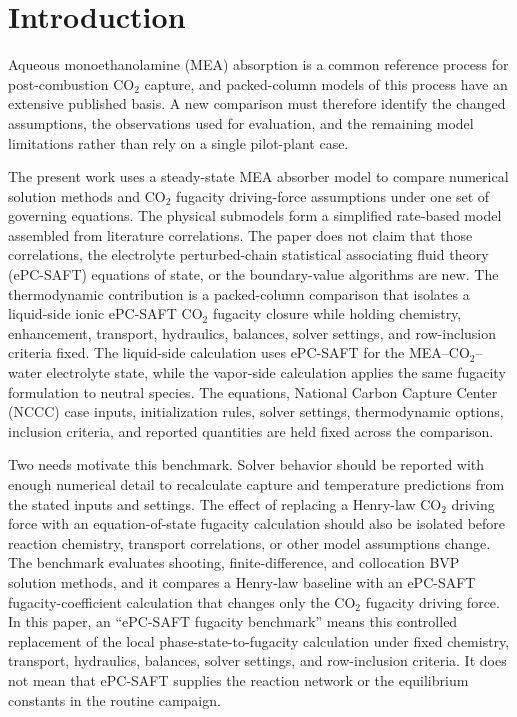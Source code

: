     \section{Introduction}\label{sec:introduction}
        Aqueous monoethanolamine (MEA) absorption is a common reference process for post-combustion CO$_2$ capture, and packed-column models of this process have an extensive published basis. A new comparison must therefore identify the changed assumptions, the observations used for evaluation, and the remaining model limitations rather than rely on a single pilot-plant case.

        The present work uses a steady-state MEA absorber model to compare numerical solution methods and CO$_2$ fugacity driving-force assumptions under one set of governing equations. The physical submodels form a simplified rate-based model assembled from literature correlations. The paper does not claim that those correlations, the electrolyte perturbed-chain statistical associating fluid theory (ePC-SAFT) equations of state, or the boundary-value algorithms are new. The thermodynamic contribution is a packed-column comparison that isolates a liquid-side ionic ePC-SAFT CO$_2$ fugacity closure while holding chemistry, enhancement, transport, hydraulics, balances, solver settings, and row-inclusion criteria fixed. The liquid-side calculation uses ePC-SAFT for the MEA--CO$_2$--water electrolyte state, while the vapor-side calculation applies the same fugacity formulation to neutral species. The equations, National Carbon Capture Center (NCCC) case inputs, initialization rules, solver settings, thermodynamic options, inclusion criteria, and reported quantities are held fixed across the comparison.

Two needs motivate this benchmark. Solver behavior should be reported with enough numerical detail to recalculate capture and temperature predictions from the stated inputs and settings. The effect of replacing a Henry-law CO$_2$ driving force with an equation-of-state fugacity calculation should also be isolated before reaction chemistry, transport correlations, or other model assumptions change. The benchmark evaluates shooting, finite-difference, and collocation BVP solution methods, and it compares a Henry-law baseline with an ePC-SAFT fugacity-coefficient calculation that changes only the CO$_2$ fugacity driving force. In this paper, an ``ePC-SAFT fugacity benchmark'' means this controlled replacement of the local phase-state-to-fugacity calculation under fixed chemistry, transport, hydraulics, balances, solver settings, and row-inclusion criteria. It does not mean that ePC-SAFT supplies the reaction network or the equilibrium constants in the routine campaign.

